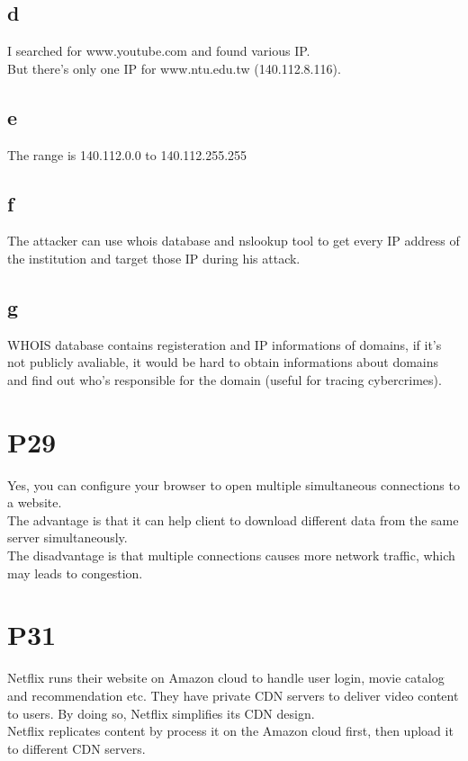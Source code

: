 \documentclass[11pt,a4paper]{article}
\begin{document}
\subsection{d}
I searched for www.youtube.com and found various IP.\\
But there's only one IP for www.ntu.edu.tw (140.112.8.116).

\subsection{e}
The range is 140.112.0.0 to 140.112.255.255

\subsection{f}
The attacker can use whois database and nslookup tool to get every IP address of the institution and target those IP 
during his attack.

\subsection{g}
WHOIS database contains registeration and IP informations of domains, if it's not publicly avaliable, it would 
be hard to obtain informations about domains and find out who's responsible for the domain (useful for tracing cybercrimes).

\section{P29}
Yes, you can configure your browser to open multiple simultaneous connections to a website.\\
The advantage is that it can help client to download different data from the same server simultaneously.\\
The disadvantage is that multiple connections causes more network traffic, which may leads to congestion.

\section{P31}
Netflix runs their website on Amazon cloud to handle user login, movie catalog and recommendation etc. They have private CDN 
servers to deliver video content to users. By doing so, Netflix simplifies its CDN design.\\
Netflix replicates content by process it on the Amazon cloud first, then upload it to different CDN servers.
\end{document}
